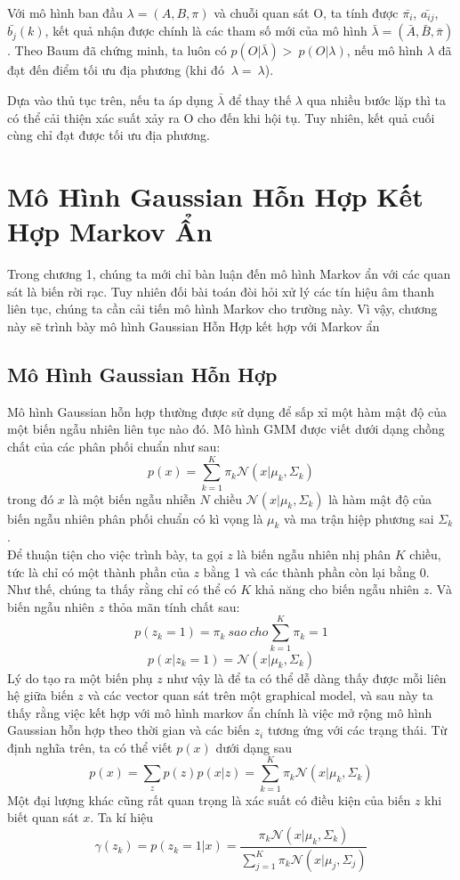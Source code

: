 \documentclass[13pt]{extreport}
\begin{document}
Với mô hình ban đầu $  \lambda = \left( A,B, \pi  \right)  $ và chuỗi quan sát O, ta tính được ${\bar{\pi_i}}$, ${\bar{a_{ij}}}$, ${\bar{b_j}}(k)$, kết quả nhận được chính là các tham số mới của mô hình $  \bar{\lambda} = \left( \bar{A},\bar{B}, \bar{\pi}  \right)  $. Theo Baum đã chứng minh, ta luôn có $ p \left( O \vert  \bar{\lambda}  \right) >~p \left( O \vert  \lambda  \right)  $, nếu mô hình $  \lambda  $ đã đạt đến điểm tối ưu địa phương (khi đó $ ~ \lambda =~ \lambda  $). \par
Dựa vào thủ tục trên, nếu ta áp dụng $\bar{\lambda}$ để thay thế $\lambda$ qua nhiều bước lặp thì ta có thể cải thiện xác suất xảy ra O cho đến khi hội tụ. Tuy nhiên, kết quả cuối cùng chỉ đạt được tối ưu địa phương.
\chapter{Mô Hình Gaussian Hỗn Hợp Kết Hợp Markov Ẩn}
Trong chương 1, chúng ta mới chỉ bàn luận đến mô hình Markov ẩn với các quan sát là biến rời rạc. Tuy nhiên đối bài toán đòi hỏi xử lý các tín hiệu âm thanh liên tục, chúng ta cần cải tiến mô hình Markov cho trường này. Vì vậy, chương này sẽ trình bày mô hình Gaussian Hỗn Hợp kết hợp với Markov ẩn

\section{Mô Hình Gaussian Hỗn Hợp}
Mô hình Gaussian hỗn hợp thường được sử dụng để sấp xỉ một hàm mật độ của một biến ngẫu nhiên liên tục nào đó. Mô hình GMM được viết dưới dạng chồng chất của các phân phối chuẩn như sau:
$$p(x) = \sum_{k=1}^{K} \pi_k \mathcal{N}(x | \mu_k, \Sigma_k)$$
trong đó $x$ là một biến ngẫu nhiễn $N$ chiều $\mathcal{N}(x | \mu_k, \Sigma_k)$ là hàm mật độ của biến ngẫu nhiên phân phối chuẩn có kì vọng là $\mu_k$ và ma trận hiệp phương sai $\Sigma_k$. \\

Để thuận tiện cho việc trình bày, ta gọi $z$ là biến ngẫu nhiên nhị phân $K$ chiều, tức là chỉ có một thành phần của $z$ bằng 1 và các thành phần còn lại bằng 0. Như thế, chúng ta thấy rằng chỉ có thể có $K$ khả năng cho biến ngẫu nhiên $z$. Và biến ngẫu nhiên $z$ thỏa mãn tính chất sau:
$$ p(z_k = 1) = \pi_k \ sao \ cho \sum_{k=1}^{K} \pi_k =  1$$
$$p(x|z_k = 1) = \mathcal{N}(x| \mu_k, \Sigma_k)$$
Lý do tạo ra một biến phụ $z$ như vậy là để ta có thể dễ dàng thấy được mỗi liên hệ giữa biến $z$ và các vector quan sát trên một graphical model, và sau này ta thấy rằng việc kết hợp với mô hình markov ẩn chính là việc mở rộng mô hình Gaussian hỗn hợp theo thời gian và các biến $z_i$ tương ứng với các trạng thái. Từ định nghĩa trên, ta có thể viết $p(x)$ dưới dạng sau
$$p(x) = \sum_{z} p(z) p(x | z) = \sum_{k=1}^{K} \pi_k \mathcal{N}(x | \mu_k, \Sigma_k) $$
Một đại lượng khác cũng rất quan trọng là xác suất có điều kiện của biến $z$ khi biết quan sát $x$. Ta kí hiệu
$$\gamma(z_k) = p(z_k = 1| x) = \frac{\pi_k \mathcal{N}(x|\mu_k, \Sigma_k)}{\sum_{j=1}^{K} \pi_k \mathcal{N}(x|\mu_j, \Sigma_j)}$$
\end{document}
